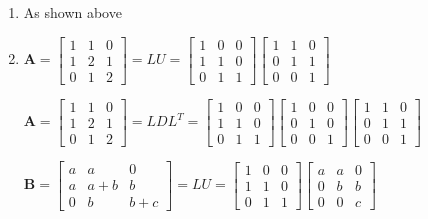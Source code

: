 \documentclass[english,onecolumn]{IEEEtran}
\begin{document}
\begin{enumerate}
    \item As shown above
    \item 
    $
    \mathbf{A} = \begin{bmatrix}
    	1 & 1 & 0\\
    	1 & 2 & 1 \\
    	0 & 1 & 2 
    \end{bmatrix}=LU=
	\begin{bmatrix}
		1 & 0 & 0\\
		1 & 1 & 0 \\
		0 & 1 & 1 
	\end{bmatrix}
	\begin{bmatrix}
	1 & 1 & 0\\
	0& 1 & 1\\
	0 & 0 & 1 
	\end{bmatrix}
    $
    
        $
    \mathbf{A} = \begin{bmatrix}
    	1 & 1 & 0\\
    	1 & 2 & 1 \\
    	0 & 1 & 2 
    \end{bmatrix}=LDL^T=
    \begin{bmatrix}
    	1 & 0 & 0\\
    	1 & 1 & 0 \\
    	0 & 1 & 1 
    \end{bmatrix}
    \begin{bmatrix}
	1 & 0& 0\\
	0& 1 & 0\\
	0 & 0 & 1 
	\end{bmatrix}
    \begin{bmatrix}
    	1 & 1 & 0\\
    	0& 1 & 1\\
    	0 & 0 & 1 
    \end{bmatrix}
    $
    
        $
    \mathbf{B} = \begin{bmatrix}
    	a & a & 0\\
    	a & a+b & b \\
    	0 & b & b+c 
    \end{bmatrix}=LU=
    \begin{bmatrix}
    	1 & 0 & 0\\
    	1 & 1 & 0 \\
    	0 & 1 & 1 
    \end{bmatrix}
    \begin{bmatrix}
    	a & a & 0\\
    	0& b & b\\
    	0 & 0 & c 
    \end{bmatrix}
    $
    

\end{enumerate}
\end{document}
